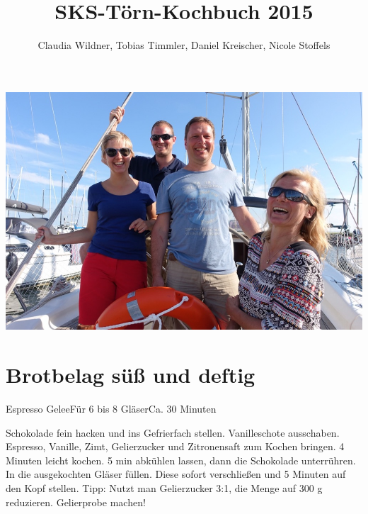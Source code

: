 \documentclass[a4paper,10pt]{article}
\title{SKS-Törn-Kochbuch 2015}
\author{Claudia Wildner, Tobias Timmler, Daniel Kreischer, Nicole Stoffels}
\begin{document}
    \maketitle
    \begin{center}
         \includegraphics[width=150mm]{Bilder/crew}
    \end{center}
    \newpage

    \tableofcontents
    \newpage


    \section{Brotbelag süß und deftig}

    \begin{recipe}{Espresso Gelee}{Für 6 bis 8 Gläser}{Ca. 30 Minuten}

        \freeform \hfill 

            Schokolade fein hacken und ins Gefrierfach stellen.
            Vanilleschote ausschaben.
            Espresso, Vanille, Zimt, Gelierzucker und Zitronensaft zum Kochen bringen. 4 Minuten leicht kochen.
            5 min abkühlen lassen, dann die Schokolade unterrühren. 
            In die ausgekochten Gläser füllen. Diese sofort verschließen und 5 Minuten auf den Kopf stellen.
        \freeform
            Tipp: Nutzt man Gelierzucker 3:1, die Menge auf 300 g reduzieren. Gelierprobe machen!
    \end{recipe}
    
\end{document}
